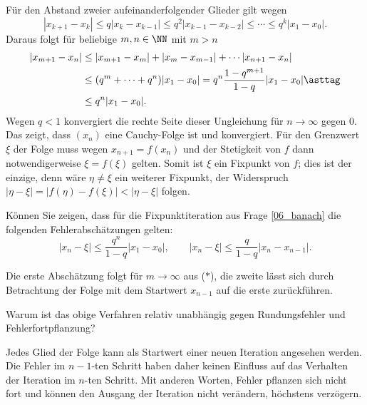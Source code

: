 \begin{antwort}
  Für den Abstand zweier aufeinanderfolgender 
  Glieder gilt wegen 
  \[
  | x_{k+1} - x_k | \le q | x_k - x_{k-1} | 
  \le q^2 | x_{k-1} - x_{k-2} | \le 
  \cdots \le q^k | x_1-x_0 |.
  \]
  Daraus folgt für beliebige $m,n\in \NN$ mit $m>n$
  \begin{align}
    | x_{m+1} - x_n | &\le | x_{m+1} - x_{m} | + | x_{m} - x_{m-1} | + 
    \cdots | x_{n+1} - x_n | \notag \\
    &\le 
    ( q^m + \cdots + q^n ) | x_1 - x_0 | =   
    q^n \frac{1-q^{m+1}}{1-q} | x_1-x_0 | \asttag \\
    &\le q^n | x_1-x_0 |. \notag
  \end{align}
  Wegen $q<1$ konvergiert die rechte Seite dieser Ungleichung 
  für $n\to \infty$ gegen $0$. Das zeigt, dass $(x_n)$ eine 
  Cauchy-Folge ist und konvergiert. 
  Für den Grenzwert $\xi$ der Folge muss wegen $x_{n+1}=f(x_n)$ 
  und der Stetigkeit von $f$ dann notwendigerweise $\xi=f(\xi)$ gelten.  
  Somit ist $\xi$ ein Fixpunkt von $f$; dies ist der einzige, denn 
  wäre $\eta \not= \xi$ ein weiterer Fixpunkt, der Widerspruch 
  $| \eta - \xi | = | f(\eta) - f(\xi) | < | \eta-\xi |$ folgen. \AntEnd  
\end{antwort} 

\begin{frage}
  Können Sie zeigen, dass 
  für die Fixpunktiteration aus Frage \ref{06_banach} 
  die folgenden Fehlerabschätzungen gelten:
  \[
  |x_n-\xi | \le \frac{q^n}{1-q} |x_1 - x_0 |, \qquad
  |x_n-\xi | \le \frac{q}{1-q} |x_n - x_{n-1} |.
  \]
\end{frage}

\begin{antwort}
  
  Die erste Abschätzung folgt für 
  $m \to \infty$ aus ($\ast$), die zweite lässt sich 
  durch Betrachtung der Folge mit dem Startwert 
  $x_{n-1}$ auf die erste zurückführen.  
  \AntEnd
\end{antwort}

\begin{frage}
  Warum ist das obige Verfahren relativ unabhängig gegen Rundungsfehler 
  und Fehlerfortpflanzung?
\end{frage}

\begin{antwort}
  Jedes Glied der Folge kann als Startwert einer neuen Iteration 
  angesehen werden. Die Fehler im $n-1$-ten Schritt 
  haben daher keinen Einfluss auf das Verhalten der Iteration 
  im $n$-ten Schritt. Mit anderen Worten, Fehler pflanzen sich 
  nicht fort und können den Ausgang der Iteration nicht verändern, 
  höchstens verzögern. 
  \AntEnd 
\end{antwort}

